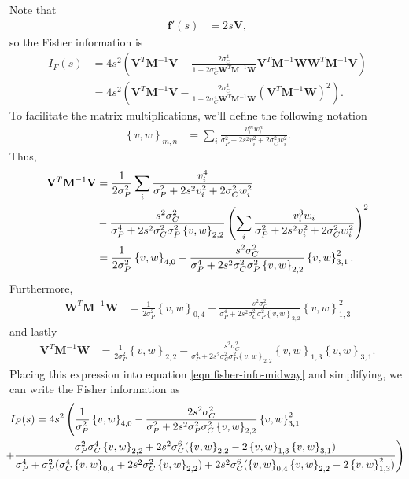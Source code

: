 \documentclass[12pt]{article}
\begin{document}
Note that
\begin{align}
	\mathbf{f}'(s) &= 2 s \mathbf{V},
\end{align}
so the Fisher information is
\begin{align}
	I_F(s) &= 4s^2 \left(\mathbf{V}^T \mathbf{M}^{-1} \mathbf{V} - \frac{2\sigma_C^4}{1 + 2\sigma_C^4 \mathbf{W}^T\mathbf{M}^{-1} \mathbf{W}} \mathbf{V}^T \mathbf{M}^{-1} \mathbf{W} \mathbf{W}^T \mathbf{M}^{-1}\mathbf{V}\right) \\
	&= 4s^2 \left(\mathbf{V}^T \mathbf{M}^{-1} \mathbf{V}-  \frac{2\sigma_C^4}{1 + 2\sigma_C^4 \mathbf{W}^T\mathbf{M}^{-1} \mathbf{W}} \left(\mathbf{V}^T\mathbf{M}^{-1} \mathbf{W}\right)^{2}\right). \label{eqn:fisher-info-midway}
\end{align}
To facilitate the matrix multiplications, we'll define the following notation
\begin{align}
	\left\{v, w\right\}_{m,n} &= \sum_i \frac{v_i^m w_i^n}{\sigma_P^2 + 2s^2 v_i^2 + 2\sigma_C^2 w_i^2}.
\end{align}
Thus,
\begin{align}
	\mathbf{V}^T \mathbf{M}^{-1}\mathbf{V} &= \frac{1}{2\sigma_P^2}\sum_i \frac{v_i^4}{\sigma_P^2 + 2s^2 v_i^2  +2\sigma_C^2 w_i^2} \notag \\
	&- \frac{s^2\sigma_C^2}{\sigma_P^4 + 2s^2 \sigma_C^2 \sigma_P^2 \left\{v,w\right\}_{2,2}} \left(\sum_i\frac{v_i^3 w_i}{\sigma_P^2 + 2s^2 v_i^2 + 2 \sigma_C^2 w_i^2}\right)^2 \\
	&= \frac{1}{2\sigma_P^2}\left\{v,w\right\}_{4,0} - \frac{s^2 \sigma_C^2}{\sigma_P^4 + 2s^2 \sigma_C^2 \sigma_P^2 \left\{v,w\right\}_{2,2}} \left\{v,w\right\}_{3,1}^2.
\end{align}
Furthermore,
\begin{align}
	\mathbf{W}^T \mathbf{M}^{-1}\mathbf{W}  &= \frac{1}{2\sigma_P^2}\left\{v,w\right\}_{0,4} - \frac{s^2\sigma_C^2}{\sigma_P^4 + 2s^2 \sigma_C^2 \sigma_P^2 \left\{v,w\right\}_{2,2}} \left\{v,w\right\}_{1,3}^2
\end{align}
and lastly
\begin{align}
	\mathbf{V}^T \mathbf{M}^{-1} \mathbf{W} &= \frac{1}{2\sigma_P^2}\left\{v,w\right\}_{2,2} - \frac{s^2\sigma_C^2}{\sigma_P^4 + 2s^2\sigma_C^2 \sigma_P^2\left\{v,w\right\}_{2,2}} \left\{v,w\right\}_{1,3}\left\{v,w\right\}_{3,1}.
\end{align}
Placing this expression into equation \ref{eqn:fisher-info-midway} and simplifying, we can write the Fisher information as 
\begin{align}
	I_F(s) &= 4s^2 \left(\frac{1}{\sigma_P^2}\left\{v, w\right\}_{4,0} - \frac{2s^2 \sigma_C^2}{\sigma_P^2 + 2s^2 \sigma_P^2 \sigma_C^2 \left\{v,w\right\}_{2,2}} \left\{v,w\right\}_{3,1}^2  \right. \notag \\
	&\left. \hspace{-30pt}+ \frac{\sigma_P^2 \sigma_C^4 \left\{v,w\right\}_{2,2} + 2s^2 \sigma_C^6 (\left\{v,w\right\}_{2,2} - 2 \left\{v,w\right\}_{1,3} \left\{v,w\right\}_{3,1})}{\sigma_P^4  + \sigma_P^2 (\sigma_C^4 \left\{v,w\right\}_{0,4} + 2s^2 \sigma_C^2 \left\{v,w\right\}_{2,2}) + 2s^2 \sigma_C^6 (\left\{v,w\right\}_{0,4} \left\{v,w\right\}_{2,2} - 2 \left\{v,w\right\}_{1,3}^2)}\right)
\end{align}
\end{document}
